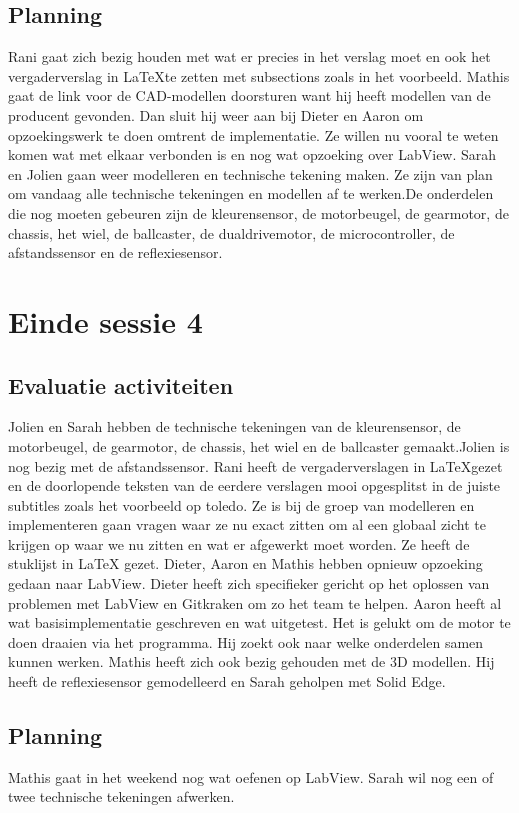 \documentclass[a4paper,twoside,kulak]{kulakreport} %
\begin{document}
\subsection{Planning}
Rani gaat zich bezig houden met wat er precies in het verslag moet en ook het vergaderverslag in \LaTeX te zetten met subsections zoals in het voorbeeld. Mathis gaat de link voor de CAD-modellen doorsturen want hij heeft modellen van de producent gevonden. Dan sluit hij weer aan bij Dieter en Aaron om opzoekingswerk te doen omtrent de implementatie. Ze willen nu vooral te weten komen wat met elkaar verbonden is en nog wat opzoeking over LabView. Sarah en Jolien gaan weer modelleren en technische tekening maken. Ze zijn van plan om vandaag alle technische tekeningen en modellen af te werken.De onderdelen die nog moeten gebeuren zijn de kleurensensor, de motorbeugel, de gearmotor, de chassis, het wiel, de ballcaster, de dualdrivemotor, de microcontroller, de afstandssensor en de reflexiesensor.
\section{Einde sessie 4}
\subsection{Evaluatie activiteiten}
Jolien en Sarah hebben de technische tekeningen van de kleurensensor, de motorbeugel, de gearmotor, de chassis, het wiel en de ballcaster gemaakt.Jolien is nog bezig met de afstandssensor. Rani heeft de vergaderverslagen in \LaTeX gezet en de doorlopende teksten van de eerdere verslagen mooi opgesplitst in de juiste subtitles zoals het voorbeeld op toledo. Ze is bij de groep van modelleren en implementeren gaan vragen waar ze nu exact zitten om al een globaal zicht te krijgen op waar we nu zitten en wat er afgewerkt moet worden. Ze heeft de stuklijst in LaTeX gezet. Dieter, Aaron en Mathis hebben opnieuw opzoeking gedaan naar LabView. Dieter heeft zich specifieker gericht op het oplossen van problemen met LabView en Gitkraken om zo het team te helpen. Aaron heeft al wat basisimplementatie geschreven en wat uitgetest. Het is gelukt om de motor te doen draaien via het programma. Hij zoekt ook naar welke onderdelen samen kunnen werken. Mathis heeft zich ook bezig gehouden met de 3D modellen. Hij heeft de reflexiesensor gemodelleerd en Sarah geholpen met Solid Edge.

\subsection{Planning}
Mathis gaat in het weekend nog wat oefenen op LabView.  
Sarah wil nog een of twee technische tekeningen afwerken.
\end{document}
